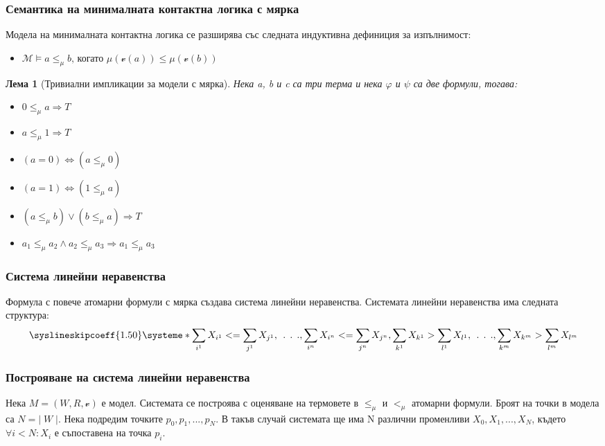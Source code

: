 \documentclass{beamer}
\newtheorem{lema}{Лема}[section]
\newcommand{\vE}{\mathscr{v}}
\begin{document}
\begin{frame}\frametitle{Семантика на минималната контактна логика с мярка}
	Модела на минималната контактна логика се разширява със следната индуктивна дефиниция за изпълнимост:
	\begin{itemize}
		\item $\mathcal{M} \models a \leq_\mu b \text{, когато } \mu(\mathscr{v}(a)) \le \mu(\mathscr{v}(b))$
	\end{itemize}

	\begin{lema}[Тривиални импликации за модели с мярка]
Нека a, b и c са три терма и нека $\varphi$ и $\psi$ са две формули, тогава:
	\begin{itemize}
		\item $0 \le_\mu a \Longrightarrow T$
		\item $a \le_\mu 1 \Longrightarrow T$
		\item $(a = 0) \iff (a \le_\mu 0)$
		\item $(a = 1) \iff (1 \le_\mu a)$
		\item $(a \le_\mu b) \lor (b \le_\mu a) \Longrightarrow T$
		\item $a_1 \le_\mu a_2 \land a_2 \le_\mu a_3 \Longrightarrow a_1 \le_\mu a_3$
	\end{itemize}
\end{lema}
\end{frame}

\begin{frame}\frametitle{Система линейни неравенства}
Формула с повече атомарни формули с мярка създава система линейни неравенства.
\newline
Системата линейни неравенства има следната структура:
		\[
			\syslineskipcoeff{1.50}
			\systeme*{\sum_{i^1} X_{i^1} <= \sum_{j^1} X_{j^1},
				\:\:.\:\:.\:\:.,
				\sum_{i^n} X_{i^n} <= \sum_{j^n} X_{j^n}, 
				\sum_{k^1} X_{k^1} > \sum_{l^1} X_{l^1},
				\:\:.\:\:.\:\:.,
				\sum_{k^m} X_{k^m} > \sum_{l^m} X_{l^m}
				}
		\]
\end{frame}

\begin{frame}\frametitle{Построяване на система линейни неравенства}
Нека $M = (W, R, \vE)$ е модел. Системата се построява с оценяване на термовете в $\le_\mu$ и  $<_\mu$ атомарни формули. 
\newline
Броят на точки в модела са $N = | \; W \; |$. Нека подредим точките $p_0, p_1, ..., p_N$. 
В такъв случай системата ще има N различни променливи $X_0, X_1, ..., X_N$, където $\forall i < N: X_i$ е съпоставена на точка $p_i$.
\end{frame}
\end{document}

